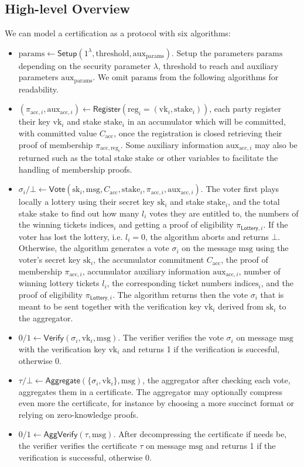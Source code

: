 \documentclass{article}
\newcommand{\vk}[1]{\ensuremath{\textrm{vk}_{#1}}\xspace}
\newcommand{\sk}[1]{\ensuremath{\textrm{sk}_{#1}}\xspace}
\newcommand{\m}{\ensuremath{\textrm{msg}}\xspace}
\newcommand{\acc}{\ensuremath{\textrm{acc}}\xspace}
\newcommand{\aux}{\ensuremath{\textrm{aux}}\xspace}
\newcommand{\pp}{\ensuremath{\textrm{params}}\xspace}
\newcommand{\reg}[1]{\ensuremath{\textrm{reg}_{#1}}\xspace}
\newcommand{\stake}[1]{\ensuremath{\textrm{stake}_{#1}}\xspace}
\newcommand{\indices}[1]{\ensuremath{\textrm{indices}_{#1}}\xspace}
\newcommand{\Lottery}{\ensuremath{\mathsf{Lottery}}\xspace}
\newcommand{\Vote}{\ensuremath{\mathsf{Vote}}\xspace}
\newcommand{\Verify}{\ensuremath{\mathsf{Verify}}\xspace}
\newcommand{\Aggregate}{\ensuremath{\mathsf{Aggregate}}\xspace}
\newcommand{\AggVerify}{\ensuremath{\mathsf{AggVerify}}\xspace}
\newcommand{\Setup}{\ensuremath{\mathsf{Setup}}\xspace}
\newcommand{\Register}{\ensuremath{\mathsf{Register}}\xspace}
\begin{document}
%
%
\subsection{High-level Overview}

We can model a certification as a protocol with six algorithms:
\begin{itemize}
    \item $\pp \leftarrow \Setup(1^\lambda, \text{threshold}, \aux_\pp)$.
    Setup the parameters \pp depending on the security parameter $\lambda$, threshold to reach and auxiliary parameters $\aux_\pp$. We omit \pp from the following algorithms for readability.
    \item $(\pi_{\acc,i}, \aux_{\acc,i}) \leftarrow \Register(\reg{i}=(\vk{i}, \stake{i}))$, each party register their key $\vk{i}$ and stake $\stake{i}$ in an accumulator which will be committed, with committed value $C_\acc$, once the registration is closed retrieving their proof of membership $\pi_{\acc, \reg{i}}$. Some auxiliary information $\aux_{\acc, i}$ may also be returned such as the total stake $\stake{}$ or other variables to facilitate the handling of membership proofs.
    
    \item $\sigma_i / \bot \leftarrow \Vote(\sk{i}, \m, C_\acc, \stake{i}, \pi_{\acc,i}, \aux_{\acc,i})$.
    The voter first plays locally a lottery using their secret key \sk{i} and stake \stake{i}, and the total stake \stake{} to find out how many $l_i$ votes they are entitled to, the numbers of the winning tickets $\indices{i}$ and getting a proof of eligibility $\pi_{\Lottery, i}$. 
    If the voter has lost the lottery, i.e. $l_i = 0$, the algorithm aborts and returns $\bot$.
    Otherwise, the algorithm generates a vote $\sigma_i$ on the message \m using the voter's secret key \sk{i}, the accumulator commitment $C_\acc$, the proof of membership $ \pi_{\acc,i}$, accumulator auxiliary information $\aux_{\acc,i}$, number of winning lottery tickets $l_i$, the corresponding ticket numbers $\indices{i}$, and the proof of eligibility $\pi_{\Lottery, i}$.
    The algorithm returns then the vote $\sigma_i$ that is meant to be sent together with the verification key \vk{i} derived from \sk{i} to the aggregator.

    \item $0/1 \leftarrow \Verify(\sigma_i, \vk{i}, \m)$.
    The verifier verifies the vote $\sigma_{i}$ on message \m with the verification key $\vk{i}$ and returns 1 if the verification is succesful, otherwise 0.
    
    \item $\tau / \bot \leftarrow \Aggregate(\{\sigma_i, \vk{i}\}, \m)$, the aggregator after checking each vote, aggregates them in a certificate.  The aggregator may optionally compress even more the certificate, for instance by choosing a more succinct format or relying on zero-knowledge proofs. 
    
    \item $0/1 \leftarrow \AggVerify(\tau, \m)$.
    After decompressing the certificate if needs be, the verifier verifies the certificate $\tau$  on message \m and returns 1 if the verification is successful, otherwise 0.
\end{itemize}
\end{document}

